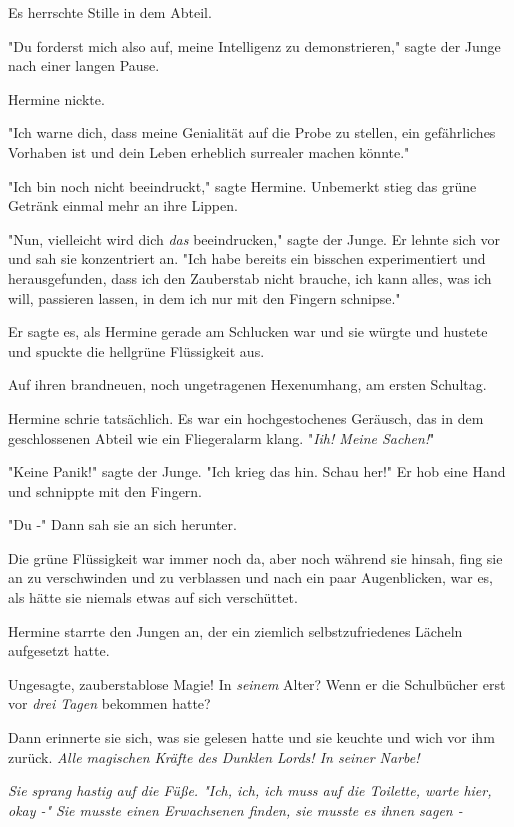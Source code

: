 {Es herrschte Stille in dem Abteil.

"Du forderst mich also auf, meine Intelligenz zu demonstrieren," sagte der Junge nach einer langen Pause.

Hermine nickte.

"Ich warne dich, dass meine Genialität auf die Probe zu stellen, ein gefährliches Vorhaben ist und dein Leben erheblich surrealer machen könnte."

"Ich bin noch nicht beeindruckt," sagte Hermine. Unbemerkt stieg das grüne Getränk einmal mehr an ihre Lippen.

"Nun, vielleicht wird dich \emph{das} beeindrucken," sagte der Junge. Er lehnte sich vor und sah sie konzentriert an. "Ich habe bereits ein bisschen experimentiert und herausgefunden, dass ich den Zauberstab nicht brauche, ich kann alles, was ich will, passieren lassen, in dem ich nur mit den Fingern schnipse."

Er sagte es, als Hermine gerade am Schlucken war und sie würgte und hustete und spuckte die hellgrüne Flüssigkeit aus.

Auf ihren brandneuen, noch ungetragenen Hexenumhang, am ersten Schultag.

Hermine schrie tatsächlich. Es war ein hochgestochenes Geräusch, das in dem geschlossenen Abteil wie ein Fliegeralarm klang. "\emph{Iih! Meine Sachen!}"

"Keine Panik!" sagte der Junge. "Ich krieg das hin. Schau her!" Er hob eine Hand und schnippte mit den Fingern.

"Du -" Dann sah sie an sich herunter.

Die grüne Flüssigkeit war immer noch da, aber noch während sie hinsah, fing sie an zu verschwinden und zu verblassen und nach ein paar Augenblicken, war es, als hätte sie niemals etwas auf sich verschüttet.

Hermine starrte den Jungen an, der ein ziemlich selbstzufriedenes Lächeln aufgesetzt hatte.

Ungesagte, zauberstablose Magie! In \emph{seinem} Alter? Wenn er die Schulbücher erst vor \emph{drei Tagen} bekommen hatte?

Dann erinnerte sie sich, was sie gelesen hatte und sie keuchte und wich vor ihm zurück. \emph{Alle magischen Kräfte des Dunklen Lords! In seiner Narbe!}

\emph{Sie sprang hastig auf die Füße. "Ich, ich, ich muss auf die Toilette, warte hier, okay -"} \emph{Sie musste einen Erwachsenen finden, sie musste es ihnen sagen -}

}
